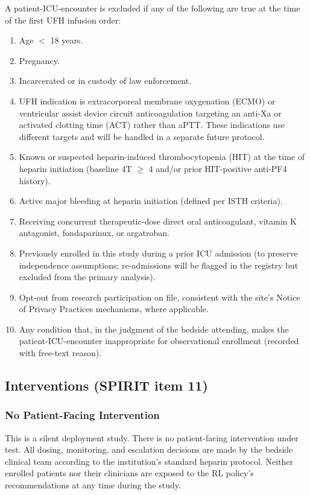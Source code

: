 \documentclass[11pt]{article}
\begin{document}
A patient-ICU-encounter is excluded if any of the following are true at the time of the first UFH infusion order:
\begin{enumerate}
  \item Age $<$ 18 years.
  \item Pregnancy.
  \item Incarcerated or in custody of law enforcement.
  \item UFH indication is extracorporeal membrane oxygenation (ECMO) or ventricular assist device circuit anticoagulation targeting an anti-Xa or activated clotting time (ACT) rather than aPTT. These indications use different targets and will be handled in a separate future protocol.
  \item Known or suspected heparin-induced thrombocytopenia (HIT) at the time of heparin initiation (baseline 4T $\geq$ 4 and/or prior HIT-positive anti-PF4 history).
  \item Active major bleeding at heparin initiation (defined per ISTH criteria).
  \item Receiving concurrent therapeutic-dose direct oral anticoagulant, vitamin K antagonist, fondaparinux, or argatroban.
  \item Previously enrolled in this study during a prior ICU admission (to preserve independence assumptions; re-admissions will be flagged in the registry but excluded from the primary analysis).
  \item Opt-out from research participation on file, consistent with the site's Notice of Privacy Practices mechanisms, where applicable.
  \item Any condition that, in the judgment of the bedside attending, makes the patient-ICU-encounter inappropriate for observational enrollment (recorded with free-text reason).
\end{enumerate}

\subsection{Interventions (SPIRIT item 11)}

\subsubsection{No Patient-Facing Intervention}

This is a silent deployment study. There is no patient-facing intervention under test. All dosing, monitoring, and escalation decisions are made by the bedside clinical team according to the institution's standard heparin protocol. Neither enrolled patients nor their clinicians are exposed to the RL policy's recommendations at any time during the study.
\end{document}
